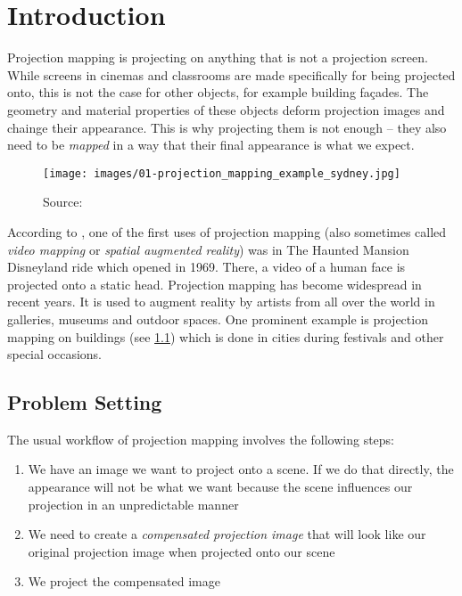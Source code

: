 \chapter{Introduction}
\label{chapter:intro}


Projection mapping is projecting on anything that is not a projection screen. While screens in cinemas and classrooms are made specifically for being projected onto, this is not the case for other objects, for example building façades. The geometry and material properties of these objects deform projection images and chainge their appearance. This is why projecting them is not enough -- they also need to be \textit{mapped} in a way that their final appearance is what we expect.

\begin{figure}[ht]
    \begin{center}
        \texttt{[image: images/01-projection\_mapping\_example\_sydney.jpg]}
        \caption{Source: \citet{ImageProjectionMappingExampleSydney}}
        \label{fig:intro_example_sydney}
    \end{center}
\end{figure}

According to \citet*{WikiHauntedMansion}, one of the first uses of projection mapping (also sometimes called \textit{video mapping} or \textit{spatial augmented reality}) was in The Haunted Mansion Disneyland ride which opened in 1969. There, a video of a human face is projected onto a static head. Projection mapping has become widespread in recent years. It is used to augment reality by artists from all over the world in galleries, museums and outdoor spaces. One prominent example is projection mapping on buildings (see \ref{fig:intro_example_sydney}) which is done in cities during festivals and other special occasions.

\section{Problem Setting}
\label{section:intro-problem_setting}

The usual workflow of projection mapping involves the following steps:

\begin{enumerate}
    \item We have an image we want to project onto a scene. If we do that directly, the appearance will not be what we want because the scene influences our projection in an unpredictable manner
    \item We need to create a \textit{compensated projection image} that will look like our original projection image when projected onto our scene
    \item We project the compensated image
\end{enumerate}

